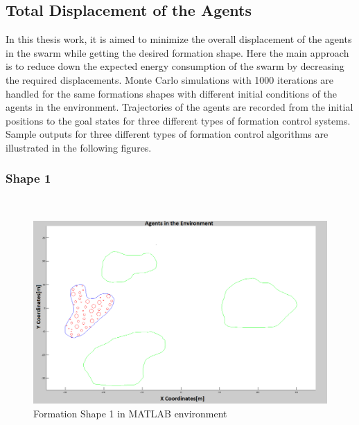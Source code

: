 \subsection{Total Displacement of the Agents}  \label{total_dist_ref}
		
In this thesis work, it is aimed to minimize the overall displacement of the agents in the swarm while getting the desired formation shape. Here the main approach is to reduce down the expected energy consumption of the swarm by decreasing the required displacements. Monte Carlo simulations with 1000 iterations are handled for the same formations shapes with different initial conditions of the agents in the environment. Trajectories of the agents are recorded from the initial positions to the goal states for three different types of formation control systems. Sample outputs for three different types of formation control algorithms are illustrated in the following figures.
		
\subsubsection{Shape 1}\hspace{0pt} \\
		
\begin{figure}[H]
\caption{Formation Shape 1 in MATLAB environment}
\centerline{\includegraphics[scale = 0.32]{Trajectories_Formation_Shape_1_2}}
\end{figure} 	
			
